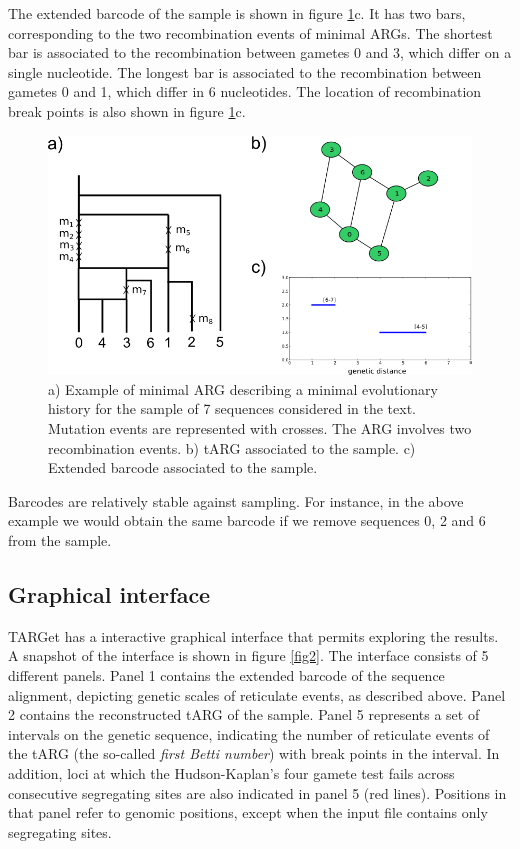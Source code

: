\documentclass[12pt]{article}
\begin{document}
The extended barcode of the sample is shown in figure \ref{fig1}c. It has two bars, corresponding to the two recombination events of minimal ARGs. The shortest bar is associated to the recombination between gametes 0 and 3, which differ on a single nucleotide. The longest bar is associated to the recombination between gametes 0 and 1, which differ in 6 nucleotides. The location of recombination break points is also shown in figure \ref{fig1}c.

\begin{figure}[!ht]
\centering
\includegraphics[width=14.cm, angle=0]{draw.png}
\caption{a) Example of minimal ARG describing a minimal evolutionary history for the sample of 7 sequences considered in the text. Mutation events are represented with crosses. The ARG involves two recombination events. b) tARG associated to the sample. c) Extended barcode associated to the sample.
\label{fig1}}
\end{figure} 

Barcodes are relatively stable against sampling. For instance, in the above example we would obtain the same barcode if we remove sequences 0, 2 and 6 from the sample. 

\subsection*{Graphical interface}

TARGet has a interactive graphical interface that permits exploring the results. A snapshot of the interface is shown in figure \ref{fig2}. The interface consists of 5 different panels. Panel 1 contains the extended barcode of the sequence alignment, depicting genetic scales of reticulate events, as described above. Panel 2 contains the reconstructed tARG of the sample. Panel 5 represents a set of intervals on the genetic sequence, indicating the number of reticulate events of the tARG (the so-called \emph{first Betti number}) with break points in the interval. In addition, loci at which the Hudson-Kaplan's four gamete test \cite{hk} fails across consecutive segregating sites are also indicated in panel 5 (red lines). Positions in that panel refer to genomic positions, except when the input file contains only segregating sites. 
\end{document}
